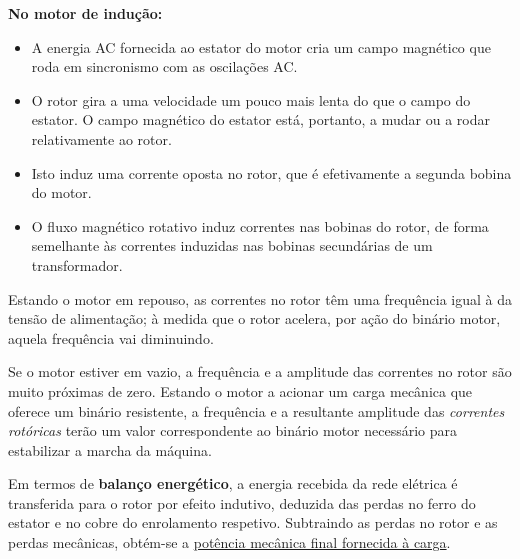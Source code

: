 \begin{minipage}[b]{0.275\linewidth}
\begin{figure}[H]
    \end{figure} 
\end{minipage}\hfill
\begin{minipage}[b]{0.53\linewidth}
 \noindent \textbf{No motor de indução:}
 \begin{itemize}
     \item A energia AC fornecida ao estator do motor cria um campo magnético que roda em sincronismo com as oscilações AC.
     \item O rotor gira a uma velocidade um pouco mais lenta do que o campo do estator. O campo magnético do estator está, portanto, a mudar ou a rodar relativamente ao rotor.
     \item Isto induz uma corrente oposta no rotor, que é efetivamente a segunda bobina do motor.
     \item O fluxo magnético rotativo induz correntes nas bobinas do rotor, de forma semelhante às correntes induzidas nas bobinas secundárias de um transformador.
 \end{itemize}
\end{minipage}

\vspace{1em}
\noindent Estando o motor em repouso, as correntes no rotor têm uma frequência igual à da tensão de alimentação; à medida que o rotor acelera, por ação do binário motor, aquela frequência vai diminuindo. 

Se o motor estiver em vazio, a frequência e a amplitude das correntes no rotor são muito próximas de zero. Estando o motor a acionar um carga mecânica que oferece um binário resistente, a frequência e a resultante amplitude das \textit{correntes rotóricas} terão um valor correspondente ao binário motor necessário para estabilizar a marcha da máquina.

\begin{mdframed}
    Em termos de \textbf{balanço energético}, a energia recebida da rede elétrica é transferida para o rotor por efeito indutivo, deduzida das perdas no ferro do estator e no cobre do enrolamento respetivo. Subtraindo as perdas no rotor e as perdas mecânicas, obtém-se a \underline{potência mecânica final fornecida à carga}.
\end{mdframed}


